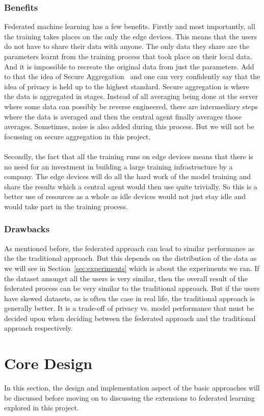 \documentclass[12pt]{article}
\begin{document}
\subsubsection{Benefits}
Federated machine learning has a few benefits. Firstly and most importantly, all the training takes places on the only the edge devices. This means that the users do not have to share their data with anyone. The only data they share are the parameters learnt from the training process that took place on their local data. And it is impossible to recreate the original data from just the parameters. Add to that the idea of Secure Aggregation~\cite{secagg} and one can very confidently say that the idea of privacy is held up to the highest standard. Secure aggregation is where the data is aggregated in stages. Instead of all averaging being done at the server where some data can possibly be reverse engineered, there are intermediary steps where the data is averaged and then the central agent finally averages those averages. Sometimes, noise is also added during this process. But we will not be focussing on secure aggregation in this project. 
\\\\
Secondly, the fact that all the training runs on edge devices means that there is no need for an investment in building a large training infrastructure by a company. The edge devices will do all the hard work of the model training and share the results which a central agent would then use quite trivially. So this is a better use of resources as a whole as idle devices would not just stay idle and would take part in the training process.
\subsubsection{Drawbacks}
As mentioned before, the federated approach can lead to similar performance as the the traditional approach. But this depends on the distribution of the data as we will see in Section~\ref{sec:experiments} which is about the experiments we ran. If the dataset amongst all the users is very similar, then the overall result of the federated process can be very similar to the traditional approach. But if the users have skewed datasets, as is often the case in real life, the traditional approach is generally better. It is a trade-off of privacy vs. model performance that must be decided upon when deciding between the federated approach and the traditional approach respectively.
\clearpage

\section{Core Design}
In this section, the design and implementation aspect of the basic approaches will be discussed before moving on to discussing the extensions to federated learning explored in this project. 
\end{document}

